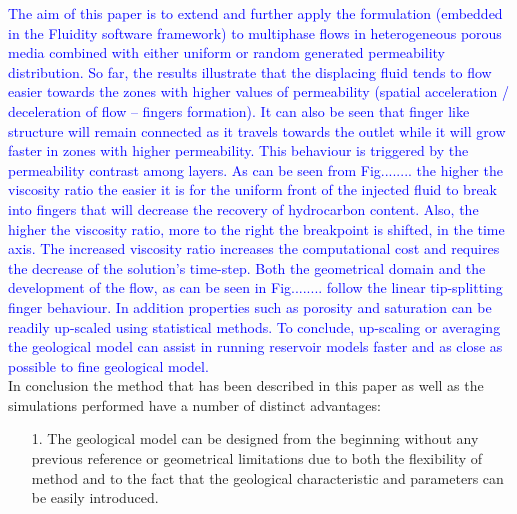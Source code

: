 \documentclass[preprint,authoryear,12pt]{elsarticle}
\begin{document}
{\textcolor{blue}{The aim of this paper is to extend and further apply the formulation (embedded in the Fluidity software framework) to multiphase flows in heterogeneous porous media combined with either uniform or random generated permeability distribution. So far, the results illustrate that the displacing fluid tends to flow easier towards the zones with higher values of permeability (spatial acceleration / deceleration of flow – fingers formation). It can also be seen that finger like structure will remain connected as it travels towards the outlet while it will grow faster in zones with higher permeability. This behaviour is triggered by the permeability contrast among layers.
As can be seen from Fig........ the higher the viscosity ratio the easier it is for the uniform front of the injected fluid to break into fingers that will decrease the recovery of hydrocarbon content. Also, the higher the viscosity ratio, more to the right the breakpoint is shifted, in the time axis. The increased viscosity ratio increases the computational cost and requires the decrease of the solution's time-step.
Both the geometrical domain and the development of the flow, as can be seen in Fig........ follow the linear tip-splitting finger behaviour. In addition properties such as porosity and saturation can be readily up-scaled using statistical methods.%
To conclude, up-scaling or averaging the geological model can assist in running reservoir models faster and as close as possible to fine geological model.}\\

In conclusion the method that has been described in this paper as well as the simulations performed have a number of distinct advantages: 

\begin{enumerate}
\item[1.] The geological model can be designed from the beginning without any previous reference or geometrical limitations due to both the flexibility of method and to the fact that the geological characteristic and parameters can be easily introduced.


\end{enumerate}}
\end{document}
